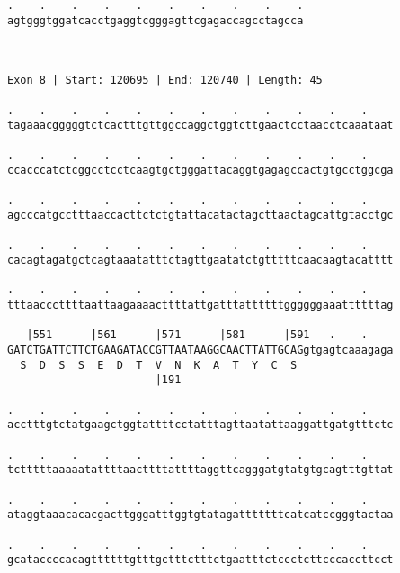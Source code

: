 \documentclass{article}
\begin{document}
\begin{Verbatim}
.    .    .    .    .    .    .    .    .    .
agtgggtggatcacctgaggtcgggagttcgagaccagcctagcca
                                              
                                              
 
Exon 8 | Start: 120695 | End: 120740 | Length: 45
 
.    .    .    .    .    .    .    .    .    .    .    .    
tagaaacgggggtctcactttgttggccaggctggtcttgaactcctaacctcaaataat
                                                            
.    .    .    .    .    .    .    .    .    .    .    .    
ccacccatctcggcctcctcaagtgctgggattacaggtgagagccactgtgcctggcga
                                                            
.    .    .    .    .    .    .    .    .    .    .    .    
agcccatgcctttaaccacttctctgtattacatactagcttaactagcattgtacctgc
                                                            
.    .    .    .    .    .    .    .    .    .    .    .    
cacagtagatgctcagtaaatatttctagttgaatatctgtttttcaacaagtacatttt
                                                            
.    .    .    .    .    .    .    .    .    .    .    .    
tttaacccttttaattaagaaaacttttattgatttattttttggggggaaattttttag
                                                            
   |551      |561      |571      |581      |591   .    .    
GATCTGATTCTTCTGAAGATACCGTTAATAAGGCAACTTATTGCAGgtgagtcaaagaga
  S  D  S  S  E  D  T  V  N  K  A  T  Y  C  S               
                       |191                                 
  
.    .    .    .    .    .    .    .    .    .    .    .    
acctttgtctatgaagctggtattttcctatttagttaatattaaggattgatgtttctc
                                                            
.    .    .    .    .    .    .    .    .    .    .    .    
tctttttaaaaatattttaacttttattttaggttcagggatgtatgtgcagtttgttat
                                                            
.    .    .    .    .    .    .    .    .    .    .    .    
ataggtaaacacacgacttgggatttggtgtatagatttttttcatcatccgggtactaa
                                                            
.    .    .    .    .    .    .    .    .    .    .    .    
gcataccccacagttttttgtttgctttctttctgaatttctccctcttcccaccttcct
                                                            

\end{Verbatim}
\end{document}
